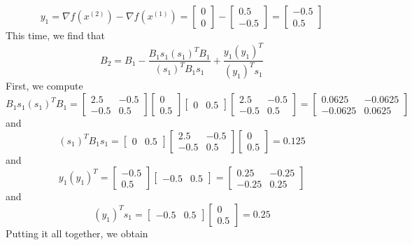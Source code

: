 \documentclass[12pt]{article}
\begin{document}
\[
y_1 = \nabla f(x^{(2)}) - \nabla f(x^{(1)}) = 
\begin{bmatrix}
0\\
0
\end{bmatrix} - 
\begin{bmatrix}
0.5\\
-0.5
\end{bmatrix} =
\begin{bmatrix}
-0.5\\
0.5
\end{bmatrix}
\] This time, we find that
\[
B_2 = B_1 - \frac{B_1 s_1 (s_1)^T B_1}{(s_1)^T B_1 s_1} + \frac{y_1 (y_1)^T}{(y_1)^T s_1}
\] First, we compute
\[
B_1 s_1 (s_1)^T B_1 = \begin{bmatrix}
2.5 & -0.5\\
-0.5 & 0.5
\end{bmatrix}
\begin{bmatrix}
0 \\ 0.5
\end{bmatrix}
\begin{bmatrix}
0 & 0.5
\end{bmatrix}
 \begin{bmatrix}
2.5 & -0.5\\
-0.5 & 0.5
\end{bmatrix} = 
\begin{bmatrix}
0.0625 & -0.0625\\
-0.0625 & 0.0625
\end{bmatrix}
\] and
\[
(s_1)^T B_1 s_1 = 
\begin{bmatrix}
0 & 0.5
\end{bmatrix}
 \begin{bmatrix}
2.5 & -0.5\\
-0.5 & 0.5
\end{bmatrix}
 \begin{bmatrix}
0 \\ 0.5
\end{bmatrix} = 0.125
\] and
\[
y_1(y_1)^T = 
\begin{bmatrix}
-0.5 \\ 0.5
\end{bmatrix}
 \begin{bmatrix}
-0.5 & 0.5
\end{bmatrix}
=\begin{bmatrix}
0.25 & -0.25\\
-0.25 & 0.25
\end{bmatrix}
\] and
\[
(y_1)^T s_1 = 
\begin{bmatrix}
-0.5 & 0.5
\end{bmatrix}
\begin{bmatrix}
0 \\
0.5
\end{bmatrix} = 0.25
\] Putting it all together, we obtain
\end{document}
